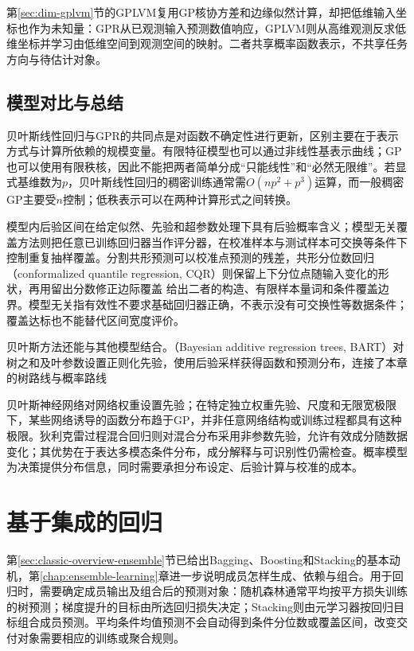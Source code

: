 第\ref{sec:dim-gplvm}节的GPLVM复用GP核协方差和边缘似然计算，却把低维输入坐标也作为未知量：GPR从已观测输入预测数值响应，GPLVM则从高维观测反求低维坐标并学习由低维空间到观测空间的映射。二者共享概率函数表示，不共享任务方向与待估计对象。

\subsection{模型对比与总结}

贝叶斯线性回归与GPR的共同点是对函数不确定性进行更新，区别主要在于表示方式与计算所依赖的规模变量。有限特征模型也可以通过非线性基表示曲线；GP也可以使用有限秩核，因此不能把两者简单分成“只能线性”和“必然无限维”。若显式基维数为$p$，贝叶斯线性回归的稠密训练通常需$O(np^2+p^3)$运算，而一般稠密GP主要受$n$控制；低秩表示可以在两种计算形式之间转换。

模型内后验区间在给定似然、先验和超参数处理下具有后验概率含义；模型无关覆盖方法则把任意已训练回归器当作评分器，在校准样本与测试样本可交换等条件下控制重复抽样覆盖。分割共形预测可以校准点预测的残差，共形分位数回归（conformalized quantile regression, CQR）则保留上下分位点随输入变化的形状，再用留出分数修正边际覆盖
给出二者的构造、有限样本量词和条件覆盖边界。模型无关指有效性不要求基础回归器正确，不表示没有可交换性等数据条件；覆盖达标也不能替代区间宽度评价。

贝叶斯方法还能与其他模型结合。（Bayesian additive regression trees, BART）对树之和及叶参数设置正则化先验，使用后验采样获得函数和预测分布，连接了本章的树路线与概率路线

贝叶斯神经网络对网络权重设置先验；在特定独立权重先验、尺度和无限宽极限下，某些网络诱导的函数分布趋于GP，并非任意网络结构或训练过程都具有这种极限。狄利克雷过程混合回归则对混合分布采用非参数先验，允许有效成分随数据变化；其优势在于表达多模态条件分布，成分解释与可识别性仍需检查。概率模型为决策提供分布信息，同时需要承担分布设定、后验计算与校准的成本。

\section{基于集成的回归}
\label{sec:regression-ensemble}

第\ref{sec:classic-overview-ensemble}节已给出Bagging、Boosting和Stacking的基本动机，第\ref{chap:ensemble-learning}章进一步说明成员怎样生成、依赖与组合。用于回归时，需要确定成员输出及组合后的预测对象：随机森林通常平均按平方损失训练的树预测；梯度提升的目标由所选回归损失决定；Stacking则由元学习器按回归目标组合成员预测。平均条件均值预测不会自动得到条件分位数或覆盖区间，改变交付对象需要相应的训练或聚合规则。

